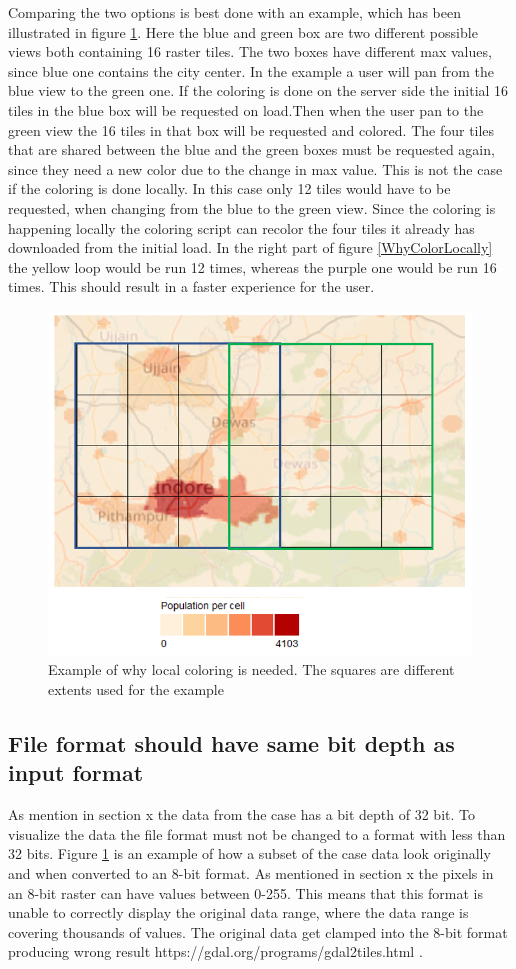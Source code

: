 Comparing the two options is best done with an example, which has been illustrated in figure \ref{WhyColorLocallyMap}. Here the blue and green box are two different possible views both containing 16 raster tiles. The two boxes have different max values, since blue one contains the city center. In the example a user will pan from the blue view to the green one. If the coloring is done on the server side the initial 16 tiles in the blue box will be requested on load.Then when the user pan to the green view the 16 tiles in that box will be requested and colored. The four tiles that are shared between the blue and the green boxes must be requested again, since they need a new color due to the change in max value. This is not the case if the coloring is done locally. In this case only 12 tiles would have to be requested, when changing from the blue to the green view. Since the coloring is happening locally the coloring script can recolor the four tiles it already has downloaded from the initial load.  In the right part of figure \ref{WhyColorLocally} the yellow loop would be run 12 times, whereas the purple one would be run 16 times. This should result in a faster experience for the user.

\begin{figure} [H]
	\centering
	\includegraphics[width=.8\textwidth]{Pictures/WhyColorLocallyMap}
	\caption{Example of why local coloring is needed. The squares are different extents used for the example}
	\label{WhyColorLocallyMap}
\end{figure}

\subsection{File format should have same bit depth as input format}
As mention in section x the data from the case has a bit depth of 32 bit. To visualize the data the file format must not be changed to a format with less than 32 bits. Figure \ref{WhyColorLocallyMap} is an example of how a subset of the case data look originally and when converted to an 8-bit format. As mentioned in section x the pixels in an 8-bit raster can have values between 0-255. This means that this format is unable to correctly display the original data range, where the data range is covering thousands of values. The original data get clamped into the 8-bit format producing wrong result
https://gdal.org/programs/gdal2tiles.html .

